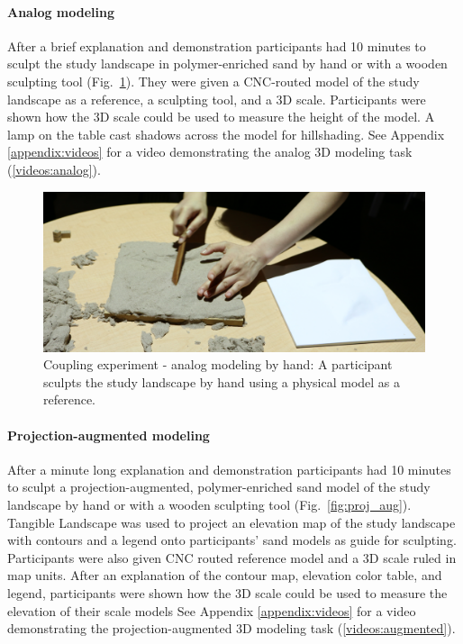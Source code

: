 \documentclass[prodmode,acmtochi]{acmsmall} %
\begin{document}
\paragraph{Analog modeling}

After a brief explanation and demonstration
participants had 10 minutes to sculpt the study landscape in polymer-enriched sand 
by hand or with a wooden sculpting tool (Fig.~\ref{fig:analog}).  
They were given a CNC-routed model of the study landscape 
as a reference, a sculpting tool, and a 3D scale. 
Participants were shown how the 3D scale could be used to 
measure the height of the model. 
A lamp on the table cast shadows across the model for hillshading.
%
See Appendix \ref{appendix:videos}
for a video demonstrating the analog 3D modeling task (\ref{videos:analog}).

\begin{figure}
\begin{center}
	\includegraphics[width=\textwidth]{images/experiments/connie_analog_1.jpg}
	\caption{Coupling experiment - analog modeling by hand:
	A participant sculpts the study landscape by hand
	using a physical model as a reference.}
	\label{fig:analog}
\end{center}
\end{figure}

\paragraph{Projection-augmented modeling}
After a minute long explanation and demonstration
participants had 10 minutes to sculpt
a projection-augmented, polymer-enriched sand model
of the study landscape by hand or with a wooden sculpting tool 
(Fig.~\ref{fig:proj_aug}). 
Tangible Landscape was used to project 
an elevation map of the study landscape
with contours and a legend
onto participants' sand models as guide for sculpting. 
Participants were also given CNC routed reference model and 
a 3D scale ruled in map units. 
After an explanation of the contour map, elevation color table, and legend,
participants were shown how the 3D scale could be used to 
measure the elevation of their scale models
%
See Appendix \ref{appendix:videos}
for a video demonstrating the projection-augmented 3D modeling task (\ref{videos:augmented}).
\end{document}
